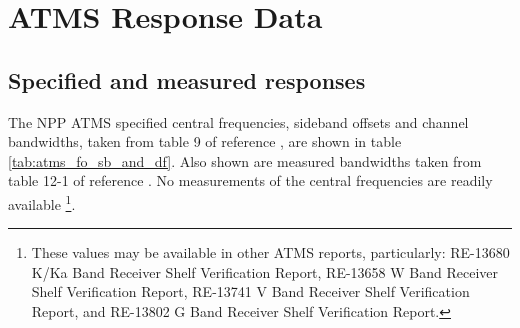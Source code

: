


\section{ATMS Response Data}

\subsection{Specified and measured responses}
The NPP ATMS specified central frequencies, sideband offsets and channel bandwidths, taken from table 9 of reference \cite{CrIS_EDR_ATBD}, are shown in table \ref{tab:atms_fo_sb_and_df}. Also shown are measured bandwidths taken from table 12-1 of reference \cite{ATMS_PFM_CalLog}. No measurements of the central frequencies are readily available \footnote{These values may be available in other ATMS reports, particularly: RE-13680 K/Ka Band Receiver Shelf Verification Report, RE-13658 W Band Receiver Shelf Verification Report, RE-13741 V Band Receiver Shelf Verification Report, and RE-13802 G Band Receiver Shelf Verification Report.}.

